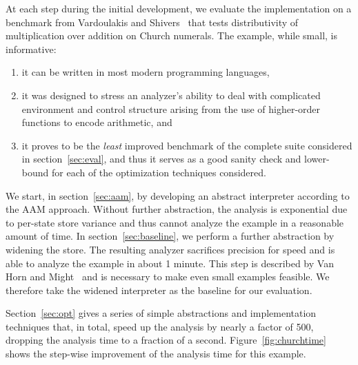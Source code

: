 \documentclass[preprint,onecolumn,9pt]{sigplanconf} %
\begin{document}
At each step during the initial development, we evaluate the
implementation on a benchmark from Vardoulakis and
Shivers~\cite{dvanhorn:Vardoulakis2011CFA2} that tests distributivity
of multiplication over addition on Church numerals.
The example, while small, is informative:
\begin{enumerate}
\item it can be written in most modern programming languages,
%
\item it was designed to stress an analyzer's ability to deal with
  complicated environment and control structure arising from the use
  of higher-order functions to encode arithmetic, and
%
\item it proves to be the \emph{least} improved benchmark of the
  complete suite considered in section~\ref{sec:eval}, and thus it
  serves as a good sanity check and lower-bound for each of the
  optimization techniques considered.
\end{enumerate}

We start, in section~\ref{sec:aam}, by developing an abstract
interpreter according to the AAM approach.  Without further
abstraction, the analysis is exponential due to per-state store
variance and thus cannot analyze the example in a reasonable amount of
time.  In section~\ref{sec:baseline}, we perform a further abstraction
by widening the store.  The resulting analyzer sacrifices precision
for speed and is able to analyze the example in about 1 minute.  This
step is described by Van Horn and Might~\cite[\S
  3.5--6]{dvanhorn:VanHorn2012Systematic} and is necessary to make
even small examples feasible.  We therefore take the widened
interpreter as the baseline for our evaluation.

Section~\ref{sec:opt} gives a series of simple abstractions and
implementation techniques that, in total, speed up the analysis by
nearly a factor of 500, dropping the analysis time to a fraction of a
second.  Figure~\ref{fig:churchtime} shows the step-wise improvement
of the analysis time for this example.
\end{document}

